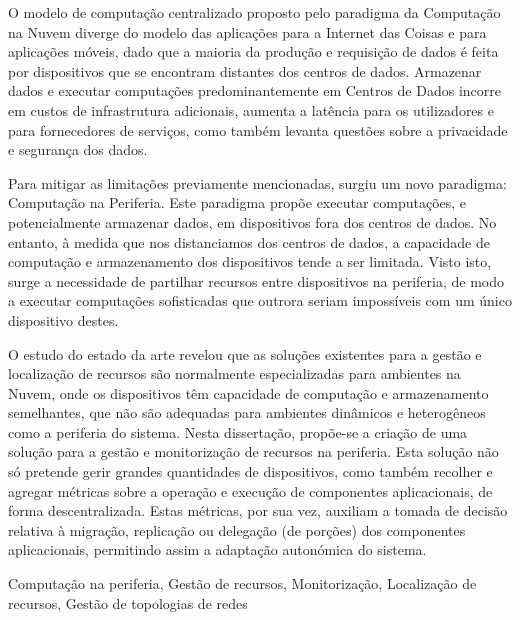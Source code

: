 
O modelo de computação centralizado proposto pelo paradigma da Computação na Nuvem diverge do modelo das aplicações para a Internet das Coisas e para aplicações móveis, dado que a maioria da produção e requisição de dados é feita por dispositivos que se encontram distantes dos centros de dados. Armazenar dados e executar computações predominantemente em Centros de Dados incorre em custos de infrastrutura adicionais, aumenta a latência para os utilizadores e para fornecedores de serviços, como também levanta questões sobre a privacidade e segurança dos dados.

Para mitigar as limitações previamente mencionadas, surgiu um novo paradigma: Computação na Periferia. Este paradigma propõe executar computações, e potencialmente armazenar dados, em dispositivos fora dos centros de dados. No entanto, à medida que nos distanciamos dos centros de dados, a capacidade de computação e armazenamento dos dispositivos tende a ser limitada. Visto isto, surge a necessidade de partilhar recursos entre dispositivos na periferia, de modo a executar computações sofisticadas que outrora seriam impossíveis com um único dispositivo destes.

O estudo do estado da arte revelou que as soluções existentes para a gestão e localização de recursos são normalmente especializadas para ambientes na Nuvem, onde os dispositivos têm capacidade de computação e armazenamento semelhantes, que não são adequadas para ambientes dinâmicos e heterogêneos como a periferia do sistema. 
Nesta dissertação, propõe-se a criação de uma solução para a gestão e monitorização de recursos na periferia. Esta solução não só pretende gerir grandes quantidades de dispositivos, como também recolher e agregar métricas sobre a operação e execução de componentes aplicacionais, de forma descentralizada.
Estas métricas, por sua vez, auxiliam a tomada de decisão relativa à migração, replicação ou delegação (de porções) dos componentes aplicacionais, permitindo assim a adaptação autonómica do sistema.


\begin{keywords}

    
    Computação na periferia, Gestão de recursos, Monitorização, Localização de recursos, Gestão de topologias de redes

\end{keywords}

